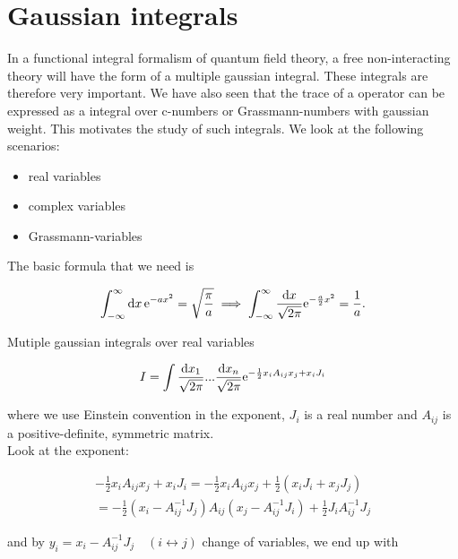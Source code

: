 
\section{Gaussian integrals}

In a functional integral formalism of quantum field theory, a free non-interacting theory will have the form of a multiple gaussian integral. These integrals are therefore very important. We have also seen that the trace of a operator can be expressed as a integral over c-numbers or Grassmann-numbers with gaussian weight. This motivates the study of such integrals. We look at the following scenarios: 

\begin{itemize}
    \item real variables
    \item complex variables
    \item Grassmann-variables
\end{itemize}

The basic formula that we need is

\begin{equation}
    \int_{-\infty}^{\infty} \dd{x} \mathrm{e}^{-ax^{2}} = \sqrt{\frac{\pi}{a}} \implies \int_{-\infty}^{\infty} \frac{\dd{x}}{\sqrt{2\pi}} \mathrm{e}^{-\frac{a}{2} x^{2}} = \frac{1}{a}. 
\end{equation}

Mutiple gaussian integrals over real variables 

\begin{equation}
    I = \int \frac{\dd{x}_{1}}{\sqrt{2\pi}} ... \frac{\dd{x}_{n}}{\sqrt{2\pi}}   \mathrm{e}^{-\frac{1}{2}x_{i} A_{ij} x_{j}  + x_{i} J_{i}}
\end{equation}

where we use Einstein convention in the exponent, $J_{i}$ is a real number and $A_{ij}$ is a positive-definite, symmetric matrix. \\ 

Look at the exponent: 

\begin{align*}
    -\frac{1}{2}x_{i} A_{ij} x_{j}  + x_{i} J_{i} = -\frac{1}{2}x_{i} A_{ij} x_{j}  + \frac{1}{2}( x_{i} J_{i} + x_{j} J_{j}) \\ = -\frac{1}{2}(x_{i} - A_{ij}^{-1}J_{j})A_{ij}(x_{j} - A_{ij}^{-1}J_{i}) + \frac{1}{2}J_{i}A_{ij}^{-1}J_{j}
\end{align*}

and by $y_{i} = x_{i} - A_{ij}^{-1}J_{j} \quad (i \leftrightarrow j)$ change of variables, we end up with 


